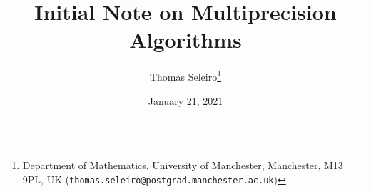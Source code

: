 \documentclass[10pt, A4paper]{article}
\begin{document}
\title{Initial Note on Multiprecision Algorithms}
\author{Thomas Seleiro\thanks
	{Department of Mathematics, University of Manchester, 
	Manchester, M13 9PL, UK
	(\texttt{thomas.seleiro@postgrad.manchester.ac.uk})}}
\date{January 21, 2021}
\maketitle
\end{document}
